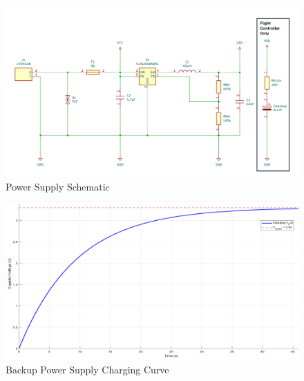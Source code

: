 \begin{figure}[htbp]
  \centering
  \includegraphics[width=\textwidth]{figs/Thomas/Custom Hardware/Power Supply.png}
  \caption{Power Supply Schematic}
  \label{fig:power_supply_schematic}
\end{figure}

\begin{figure}[htbp]
  \centering
  \includegraphics[width=\textwidth]{figs/Thomas/Custom Hardware/charging_curve.png}
  \caption{Backup Power Supply Charging Curve}
  \label{fig:charging_curve}
\end{figure}

